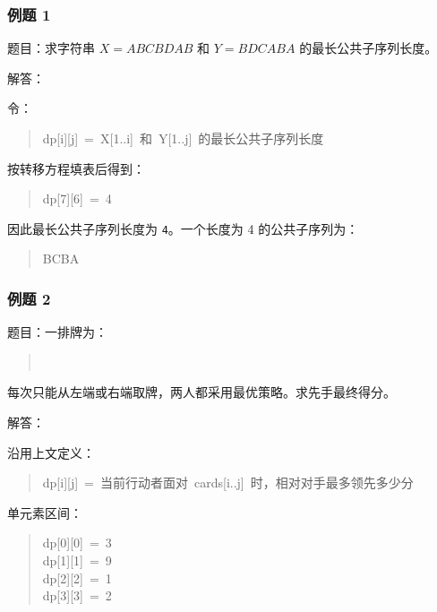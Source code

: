 \documentclass[UTF8,zihao=-4]{ctexart}
\begin{document}
\subsubsection*{例题 1}

题目：求字符串 $X = ABCBDAB$ 和 $Y = BDCABA$ 的最长公共子序列长度。

解答：

令：

\begin{quote}
\small\ttfamily\raggedright
\relax dp[i][j]\ =\ X[1..i]\ 和\ Y[1..j]\ 的最长公共子序列长度\\
\end{quote}

按转移方程填表后得到：

\begin{quote}
\small\ttfamily\raggedright
\relax dp[7][6]\ =\ 4\\
\end{quote}

因此最长公共子序列长度为 \texttt{4}。一个长度为 4 的公共子序列为：

\begin{quote}
\small\ttfamily\raggedright
\relax BCBA\\
\end{quote}

\subsubsection*{例题 2}

题目：一排牌为：

\begin{quote}
\small\ttfamily\raggedright
\relax [3,\ 9,\ 1,\ 2]\\
\end{quote}

每次只能从左端或右端取牌，两人都采用最优策略。求先手最终得分。

解答：

沿用上文定义：

\begin{quote}
\small\ttfamily\raggedright
\relax dp[i][j]\ =\ 当前行动者面对\ cards[i..j]\ 时，相对对手最多领先多少分\\
\end{quote}

单元素区间：

\begin{quote}
\small\ttfamily\raggedright
\relax dp[0][0]\ =\ 3\\
\relax dp[1][1]\ =\ 9\\
\relax dp[2][2]\ =\ 1\\
\relax dp[3][3]\ =\ 2\\
\end{quote}
\end{document}
